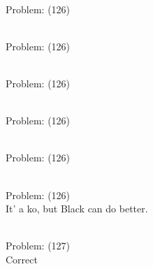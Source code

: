 \documentclass[11pt]{article}
\begin{document}
\begin{minipage}[t]{0.5\textwidth}
  {\centering
  
\\
Problem: (126)\\
  }
\end{minipage}
\begin{minipage}[t]{0.5\textwidth}
  {\centering
  
\\
Problem: (126)\\
  }
\end{minipage}
\begin{minipage}[t]{0.5\textwidth}
  {\centering
  
\\
Problem: (126)\\
  }
\end{minipage}
\begin{minipage}[t]{0.5\textwidth}
  {\centering
  
\\
Problem: (126)\\
  }
\end{minipage}
\begin{minipage}[t]{0.5\textwidth}
  {\centering
  
\\
Problem: (126)\\
  }
\end{minipage}
\begin{minipage}[t]{0.5\textwidth}
  {\centering
  
\\
Problem: (126)\\
It' a ko, but Black can do better.\\
  }
\end{minipage}
\begin{minipage}[t]{0.5\textwidth}
  {\centering
  
\\
Problem: (127)\\
Correct\\
  }
\end{minipage}
\end{document}
